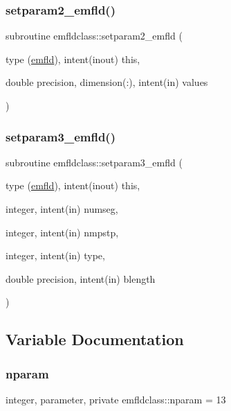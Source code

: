 \subsubsection{\texorpdfstring{setparam2\_emfld()}{setparam2\_emfld()}}
{\footnotesize\ttfamily subroutine emfldclass\+::setparam2\+\_\+emfld (\begin{DoxyParamCaption}\item[{type (\mbox{\hyperlink{namespaceemfldclass_structemfldclass_1_1emfld}{emfld}}), intent(inout)}]{this,  }\item[{double precision, dimension(\+:), intent(in)}]{values }\end{DoxyParamCaption})}

\mbox{\label{namespaceemfldclass_a3f40c1b18d4a7a28ceea11a3a6b350ad}} 
\subsubsection{\texorpdfstring{setparam3\_emfld()}{setparam3\_emfld()}}
{\footnotesize\ttfamily subroutine emfldclass\+::setparam3\+\_\+emfld (\begin{DoxyParamCaption}\item[{type (\mbox{\hyperlink{namespaceemfldclass_structemfldclass_1_1emfld}{emfld}}), intent(inout)}]{this,  }\item[{integer, intent(in)}]{numseg,  }\item[{integer, intent(in)}]{nmpstp,  }\item[{integer, intent(in)}]{type,  }\item[{double precision, intent(in)}]{blength }\end{DoxyParamCaption})}



\subsection{Variable Documentation}
\mbox{\label{namespaceemfldclass_ad6fed90f4153b92a9a9ff35a6ef146c3}} 
\subsubsection{\texorpdfstring{nparam}{nparam}}
{\footnotesize\ttfamily integer, parameter, private emfldclass\+::nparam = 13\hspace{0.3cm}{\ttfamily [private]}}

